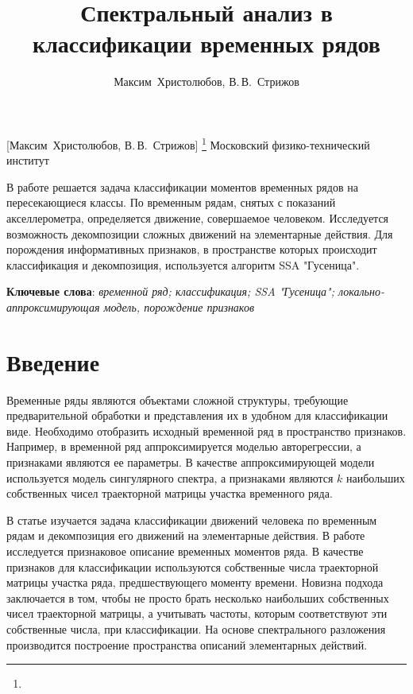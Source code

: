 \documentclass[12pt, twoside]{article}
\begin{document}
\title
    [Спектральный анализ в классификации временных рядов] %
    {Спектральный анализ в классификации временных рядов}
\author
    [Максим~Христолюбов, В.\,В.~Стрижов] %
    {Максим~Христолюбов, В.\,В.~Стрижов} %
    [Максим~Христолюбов, В.\,В.~Стрижов] %
\thanks
    {}
\organization
    {Московский физико-технический институт}
\abstract
    {В работе решается задача классификации моментов временных рядов на пересекающиеся классы. По временным рядам, снятых с показаний акселлерометра, определяется движение, совершаемое человеком. Исследуется возможность декомпозиции сложных движений на элементарные действия. Для порождения информативных признаков, в пространстве которых происходит классификация и декомпозиция, используется алгоритм SSA "Гусеница".
	
\bigskip
\noindent
\textbf{Ключевые слова}: \emph {временной ряд; классификация; SSA "Гусеница"; локально-аппроксимирующая модель, порождение признаков}
}

\maketitle
\linenumbers

\section{Введение}

Временные ряды являются объектами сложной структуры, требующие предварительной обработки и представления их в удобном для классификации виде. Необходимо отобразить исходный временной ряд в пространство признаков. Например, в \cite{Ivkin15} временной ряд аппроксимируется моделью авторегрессии, а признаками являются ее параметры. В \cite{Karasikov16} качестве аппроксимирующей модели используется модель сингулярного спектра, а признаками являются $k$ наибольших собственных чисел траекторной матрицы участка временного ряда. 

В статье изучается задача классификации движений человека по временным рядам и декомпозиция его движений на элементарные действия. В работе исследуется признаковое описание временных моментов ряда. В качестве признаков для классификации используются собственные числа траекторной матрицы участка ряда, предшествующего моменту времени. Новизна подхода заключается в том, чтобы не просто брать несколько наибольших собственных чисел траекторной матрицы, а учитывать частоты, которым соответствуют эти собственные числа, при классификации. На основе спектрального разложения производится построение пространства описаний элементарных действий.
\end{document}
